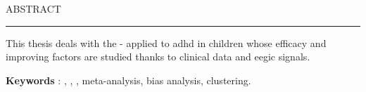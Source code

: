 

\begin{center}
\MakeUppercase{\LARGE{A}\Large{bstract}} \\
\noindent\rule{16cm}{0.4pt}
\end{center}

This thesis deals with the - applied to \gls{adhd} in children whose efficacy and improving factors are 
studied thanks to clinical data and \gls{eegic} signals.



\large{\textbf{Keywords}} : , , , meta-analysis, bias analysis, clustering.